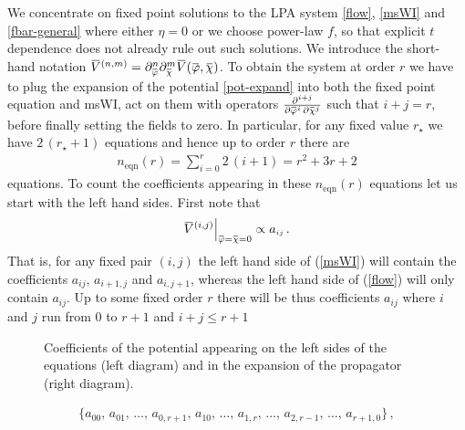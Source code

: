 \documentclass[11pt]{book}
\newcommand{\overbar}[1]{\mkern 1.5mu\overline{\mkern-1.5mu#1\mkern-1.5mu}\mkern 1.5mu}
\newcommand{\bV}{\overbar V}
\newcommand{\bp}{\overbar \varphi}
\newcommand{\bc}{\overbar \chi}
\numberwithin{equation}{chapter}
\begin{document}
We concentrate on fixed point solutions to the LPA system \eqref{flow},
\eqref{msWI} and \eqref{fbar-general} where either $\eta=0$ or we choose power-law $f$,
so that explicit $t$ dependence does not already rule out such solutions.
We introduce the short-hand notation
$\bV ^{(n,m)}=\partial_{\bp}^n \partial_{\bc}^m \bV(\bp,\bc)$.
To obtain the system at order $r$ we have to plug the expansion of the potential \eqref{pot-expand}
into both the fixed point equation and msWI, act on them with operators
$\frac{\partial^{i+j}}{\partial \bp^i \, \partial \bc^j}$ such that $i+j=r$,
before finally setting the fields to zero.
In particular, for any fixed value $r_{\star}$ we have $2 \, (r_{\star}+1)$ equations
and hence up to order $r$ there are
\begin{align}
  \label{number_eqns}
  n_{\text{eqn}}(r) = \sum_{i=0}^{r} 2\,(i+1) = r^2 + 3r + 2
\end{align}
equations.
To count the coefficients appearing in these $n_{\text{eqn}}(r)$ equations
let us start with the left hand sides.
First note that
\begin{align}
  \label{proportionality}
  \bV^{(i,j)} \Big|_{\bp = \bc = 0}
  \propto a_{\scriptscriptstyle ij} \,.
\end{align}
That is, for any fixed pair $(i,j)$ the left hand side of (\ref{msWI}) will contain the coefficients
$a_{\scriptscriptstyle ij}$, $a_{\scriptscriptstyle i+1,j}$ and $a_{\scriptscriptstyle i,j+1}$,
whereas the left hand side of (\ref{flow}) will only contain $a_{\scriptscriptstyle ij}$.
Up to some fixed order $r$ there will be thus coefficients $a_{\scriptscriptstyle ij}$
where $i$ and $j$ run from
$0$ to $r+1$ and $i+j \leqslant r+1$
\begin{figure}
  \begin{center}
    
    
  \end{center}
  \vspace*{-2mm}
  \caption{
    Coefficients of the potential appearing on the left sides of the equations (left diagram)
    and in the expansion of the propagator (right diagram).
  }
  \label{fig:diag_lhs_rhs}
\end{figure}
\begin{align}
  \label{coeff_lhs}
  \bigg\lbrace
  a_{\scriptscriptstyle 00},\, a_{\scriptscriptstyle 01},\,
  \dots ,\, a_{\scriptscriptstyle 0,r+1},\, a_{\scriptscriptstyle 10},\, \dots ,\,
  a_{\scriptscriptstyle 1,r},\, \dots ,\, a_{\scriptscriptstyle 2,r-1},\, \dots,\, a_{\scriptscriptstyle r+1,0}
  \bigg\rbrace \,,
\end{align}
\end{document}
